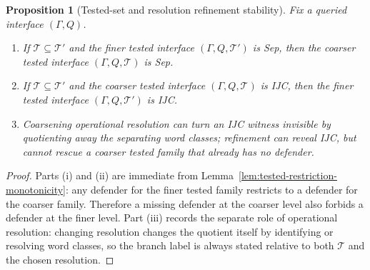 \documentclass[11pt]{article}
\newtheorem{proposition}[theorem]{Proposition}
\begin{document}
\begin{proposition}[Tested-set and resolution refinement stability]\label{prop:resolution-refinement-stability}
Fix a queried interface $(\Gamma,Q)$.
\begin{enumerate}[label=(\roman*),leftmargin=2em]
\item If $\mathcal T\subseteq\mathcal T'$ and the finer tested interface $(\Gamma,Q,\mathcal T')$ is Sep, then the coarser tested interface $(\Gamma,Q,\mathcal T)$ is Sep.
\item If $\mathcal T\subseteq\mathcal T'$ and the coarser tested interface $(\Gamma,Q,\mathcal T)$ is IJC, then the finer tested interface $(\Gamma,Q,\mathcal T')$ is IJC.
\item Coarsening operational resolution can turn an IJC witness invisible by quotienting away the separating word classes; refinement can reveal IJC, but cannot rescue a coarser tested family that already has no defender.
\end{enumerate}
\end{proposition}
\begin{proof}
Parts (i) and (ii) are immediate from Lemma~\ref{lem:tested-restriction-monotonicity}: any defender for the finer tested family restricts to a defender for the coarser family.  Therefore a missing defender at the coarser level also forbids a defender at the finer level.  Part (iii) records the separate role of operational resolution: changing resolution changes the quotient itself by identifying or resolving word classes, so the branch label is always stated relative to both $\mathcal T$ and the chosen resolution.
\end{proof}
\end{document}
